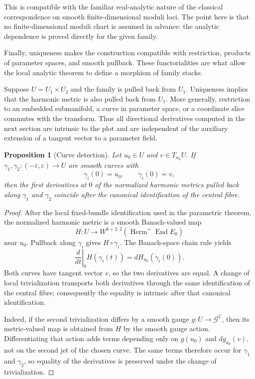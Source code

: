 \documentclass[11pt,reqno]{amsart}
\newtheorem{proposition}[theorem]{Proposition}
\theoremstyle{definition}
\theoremstyle{remark}
\newcommand{\C}{\mathbb C}
\newcommand{\End}{\operatorname{End}}
\newcommand{\Herm}{\operatorname{Herm}}
\newcommand{\eps}{\varepsilon}
\newcommand{\Ggauge}{\mathscr G}
\begin{document}
This is compatible with the familiar real-analytic nature of the classical correspondence on smooth finite-dimensional moduli loci.  The point here is that no finite-dimensional moduli chart is assumed in advance: the analytic dependence is proved directly for the given family.


Finally, uniqueness makes the construction compatible with restriction, products of parameter spaces, and smooth pullback.  These functorialities are what allow the local analytic theorem to define a morphism of family stacks.


Suppose $U=U_1\times U_2$ and the family is pulled back from $U_1$.  Uniqueness implies that the harmonic metric is also pulled back from $U_1$.  More generally, restriction to an embedded submanifold, a curve in parameter space, or a coordinate slice commutes with the transform.  Thus all directional derivatives computed in the next section are intrinsic to the plot and are independent of the auxiliary extension of a tangent vector to a parameter field.

\begin{proposition}[Curve detection]\label{prop:curve-detection}
Let $u_0\in U$ and $v\in T_{u_0}U$.  If $\gamma_1,\gamma_2:(-\eps,\eps)\to U$ are smooth curves with
\[
  \gamma_i(0)=u_0,
  \qquad
  \dot\gamma_i(0)=v,
\]
then the first derivatives at $0$ of the normalized harmonic metrics pulled back along $\gamma_1$ and $\gamma_2$ coincide after the canonical identification of the central fibre.
\end{proposition}

\begin{proof}
After the local fixed-bundle identification used in the parametric theorem, the normalized harmonic metric is a smooth Banach-valued map
\[
  H:U\longrightarrow W^{k+2,2}(\Herm^+\End E_0)
\]
near $u_0$.  Pullback along $\gamma_i$ gives $H\circ\gamma_i$.  The Banach-space chain rule yields
\[
  \left.\frac{d}{dt}\right|_0H(\gamma_i(t))
  =dH_{u_0}(\dot\gamma_i(0)).
\]
Both curves have tangent vector $v$, so the two derivatives are equal.  A change of local trivialization transports both derivatives through the same identification of the central fibre; consequently the equality is intrinsic after that canonical identification.

Indeed, if the second trivialization differs by a smooth gauge
$g:U\to\Ggauge^{\C}$, then its metric-valued map is obtained from $H$
by the smooth gauge action.  Differentiating that action adds terms
depending only on $g(u_0)$ and $dg_{u_0}(v)$, not on the second jet of
the chosen curve.  The same terms therefore occur for $\gamma_1$ and
$\gamma_2$, so equality of the derivatives is preserved under the
change of trivialization.
\end{proof}
\end{document}
